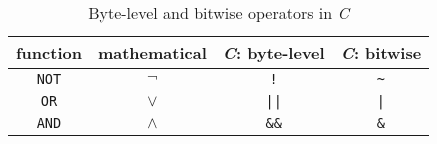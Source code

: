 \begin{table}[h]
\centering
\begin{tabular}{c|c|c|c}
function & mathematical & \emph{C}: byte-level & \emph{C}: bitwise\\
\hline
\lstinline$NOT$ & $\lnot$ & \lstinline$!$ & \lstinline$~$\\
\lstinline$OR$ & $\lor$ & \lstinline$||$ & \lstinline$|$\\
\lstinline$AND$ & $\land$ & \lstinline$&&$ & \lstinline$&$\\
\end{tabular}
\caption{Byte-level and bitwise operators in \emph{C}}
\label{table:operators}
\end{table}
